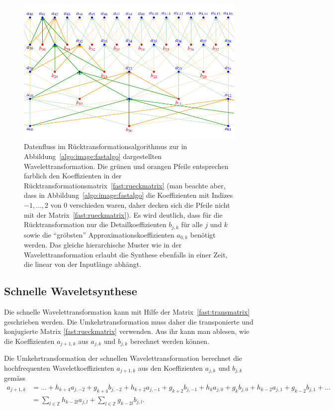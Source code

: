 \begin{figure}
\centering
\includegraphics[width=\hsize]{chapters/7-algo/images/rueckalgo.pdf}
\caption{Datenfluss im Rücktransformationsalgorithmus zur in
Abbildung~\ref{algo:image:fastalgo} dargestellten Wavelettransformation.
Die grünen und orangen Pfeile entsprechen farblich den Koeffizienten
in der Rücktransformationsmatrix~\eqref{fast:rueckmatrix} (man beachte
aber, dass in Abbildung~\ref{algo:image:fastalgo} die Koeffizienten mit
Indizes $-1,\dots,2$ von $0$ verschieden waren, daher decken sich die
Pfeile nicht mit der Matrix~\eqref{fast:rueckmatrix}).
Es wird deutlich, dass für die Rücktransformation nur die Detailkoeffizienten
$b_{j,k}$ für alle $j$ und $k$
sowie die ``gröbsten'' Approximationskoeffizienten $a_{0,k}$ benötigt werden.
Das gleiche hierarchische Muster wie in der Wavelettransformation erlaubt
die Synthese ebenfalls in einer Zeit, die linear von der Inputlänge
abhängt.
\label{fast:rueckfluss}}
\end{figure}

\subsection{Schnelle Waveletsynthese}
Die schnelle Wavelettransformation kann mit Hilfe der
Matrix~\eqref{fast:transmatrix}
geschrieben werden.
Die Umkehrtransformation muss daher die transponierte und konjugierte Matrix
\eqref{fast:rueckmatrix} verwenden.
Aus ihr kann man ablesen, wie die Koeffizienten $a_{j+1,k}$ aus $a_{j,k}$
und $b_{j,k}$ berechnet werden können.

\begin{satz}
Die Umkehrtransformation der schnellen Wavelettransformation berechnet die
hochfrequenten Waveletkoeffizienten $a_{j+1,k}$ aus den Koeffizienten
$a_{j,k}$ und $b_{j,k}$ gemäss
\begin{equation}
\begin{aligned}
a_{j+1,k}
&=
\dots
+
h_{k+4}
a_{j,-2}
+
g_{k+4}
b_{j,-2}
+
h_{k+2}
a_{j,-1}
+
g_{k+2}
b_{j,-1}
+
h_{k}
a_{j,0}
+
g_{k}
b_{j,0}
+
h_{k-2}
a_{j,1}
+
g_{k-2}
b_{j,1}
+
\dots
\\
&=
\sum_{l\in\mathbb Z}
h_{k-2l}
a_{j,l}
+
\sum_{l\in\mathbb Z}
g_{k-2l}
b_{j,l}.
\end{aligned}
\end{equation}
\end{satz}


